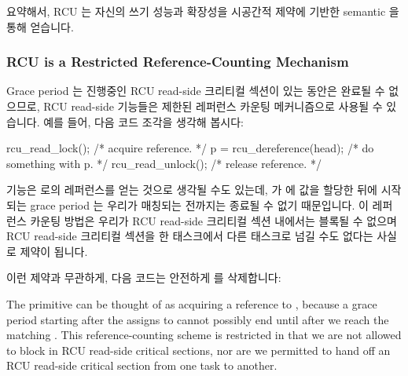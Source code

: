 \fi

요약해서, RCU 는 자신의 쓰기 성능과 확장성을 시공간적 제약에 기반한 semantic 을
통해 얻습니다.

\subsubsection{RCU is a Restricted Reference-Counting Mechanism}
\label{sec:defer:RCU is a Restricted Reference-Counting Mechanism}

Grace period 는 진행중인 RCU read-side 크리티컬 섹션이 있는 동안은 완료될 수
없으므로, RCU read-side 기능들은 제한된 레퍼런스 카운팅 메커니즘으로 사용될 수
있습니다.
예를 들어, 다음 코드 조각을 생각해 봅시다:

\begin{VerbatimN}
rcu_read_lock();  /* acquire reference. */
p = rcu_dereference(head);
/* do something with p. */
rcu_read_unlock();  /* release reference. */
\end{VerbatimN}

 기능은  로의 레퍼런스를 얻는 것으로 생각될 수도
있는데,  가  에 값을 할당한 뒤에 시작되는 grace
period 는 우리가 매칭되는  전까지는 종료될 수 없기
때문입니다.
이 레퍼런스 카운팅 방법은 우리가 RCU read-side 크리티컬 섹션 내에서는 블록될 수
없으며 RCU read-side 크리티컬 섹션을 한 태스크에서 다른 태스크로 넘길 수도
없다는 사실로 제약이 됩니다.

이런 제약과 무관하게, 다음 코드는 안전하게  를 삭제합니다:

\iffalse

The  primitive can be thought of as
acquiring a reference to , because a grace period
starting after the  assigns to 
cannot possibly end until after we reach the matching
.
This reference-counting scheme is restricted in that
we are not allowed to block in RCU read-side critical sections,
nor are we permitted to hand off an RCU read-side critical section
from one task to another.

